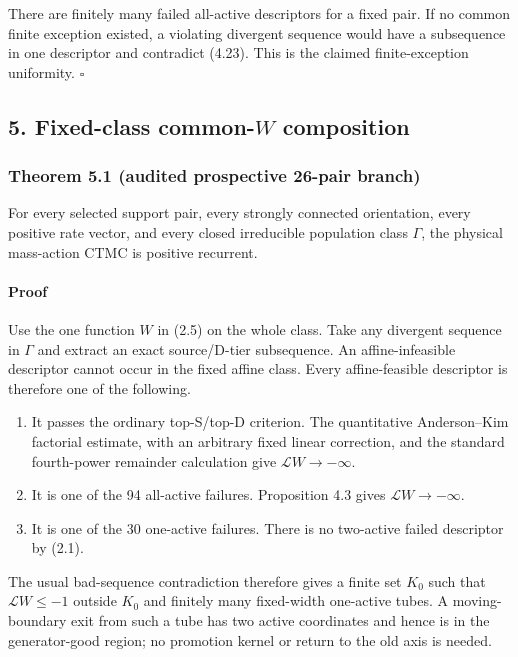 There are finitely many failed all-active descriptors for a fixed pair.
If no common finite exception existed, a violating divergent sequence
would have a subsequence in one descriptor and contradict (4.23). This
is the claimed finite-exception uniformity. \(\square\)

\subsection{\texorpdfstring{5. Fixed-class common-\(W\)
composition}{5. Fixed-class common-W composition}}

\subsubsection{Theorem 5.1 (audited prospective 26-pair
branch)}

For every selected support pair, every strongly connected orientation,
every positive rate vector, and every closed irreducible population
class \(\Gamma\), the physical mass-action CTMC is positive recurrent.

\paragraph{Proof}

Use the one function \(W\) in (2.5) on the whole class. Take any
divergent sequence in \(\Gamma\) and extract an exact source/D-tier
subsequence. An affine-infeasible descriptor cannot occur in the fixed
affine class. Every affine-feasible descriptor is therefore one of the
following.

\begin{enumerate}
\def\labelenumi{\arabic{enumi}.}
\tightlist
\item
  It passes the ordinary top-S/top-D criterion. The quantitative
  Anderson--Kim factorial estimate, with an arbitrary fixed linear
  correction, and the standard fourth-power remainder calculation give
  \(\mathcal LW\to-\infty\).
\item
  It is one of the 94 all-active failures. Proposition 4.3 gives
  \(\mathcal LW\to-\infty\).
\item
  It is one of the 30 one-active failures. There is no two-active failed
  descriptor by (2.1).
\end{enumerate}

The usual bad-sequence contradiction therefore gives a finite set
\(K_0\) such that \(\mathcal LW\le-1\) outside \(K_0\) and finitely many
fixed-width one-active tubes. A moving-boundary exit from such a tube
has two active coordinates and hence is in the generator-good region; no
promotion kernel or return to the old axis is needed.

